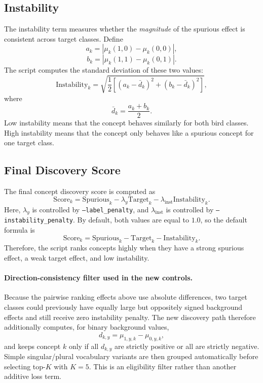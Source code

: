 \documentclass[11pt,a4paper]{article}
\begin{document}
\subsection{Instability}

The instability term measures whether the \emph{magnitude} of the spurious
effect is consistent across target classes. Define
\[
 a_k = \left|\mu_k(1,0)-\mu_k(0,0)\right|,
\]
\[
 b_k = \left|\mu_k(1,1)-\mu_k(0,1)\right|.
\]
The script computes the standard deviation of these two values:
\[
\mathrm{Instability}_k
=
\sqrt{
\frac{1}{2}
\left[
(a_k-\bar{d}_k)^2
+
(b_k-\bar{d}_k)^2
\right]
},
\]
where
\[
\bar{d}_k
=
\frac{a_k+b_k}{2}.
\]
Low instability means that the concept behaves similarly for both bird classes. High instability means that the concept only behaves like a spurious concept for one target class.

\subsection{Final Discovery Score}

The final concept discovery score is computed as
\[
\mathrm{Score}_k
=
\mathrm{Spurious}_k
-
\lambda_y \mathrm{Target}_k
-
\lambda_{\mathrm{inst}} \mathrm{Instability}_k.
\]
Here, \(\lambda_y\) is controlled by \texttt{--label\_penalty}, and
\(\lambda_{\mathrm{inst}}\) is controlled by \texttt{--instability\_penalty}.
By default, both values are equal to \(1.0\), so the default formula is
\[
\mathrm{Score}_k
=
\mathrm{Spurious}_k
-
\mathrm{Target}_k
-
\mathrm{Instability}_k.
\]
Therefore, the script ranks concepts highly when they have a strong spurious effect, a weak target effect, and low instability.

\paragraph{Direction-consistency filter used in the new controls.}
Because the pairwise ranking effects above use absolute differences, two target
classes could previously have equally large but oppositely signed background
effects and still receive zero instability penalty. The new discovery path
therefore additionally computes, for binary background values,
\[
d_{k,y}=\mu_{1,y,k}-\mu_{0,y,k},
\]
and keeps concept $k$ only if all $d_{k,y}$ are strictly positive or all are
strictly negative. Simple singular/plural vocabulary variants are then grouped
automatically before selecting top-$K$ with $K=5$. This is an eligibility filter rather
than another additive loss term.
\end{document}
